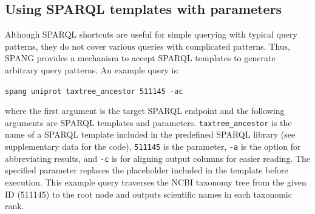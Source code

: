 \documentclass[runningheads]{llncs}
\begin{document}






\subsection{Using SPARQL templates with parameters}

Although SPARQL shortcuts are useful for simple querying with typical query patterns, they do not cover various
queries with complicated patterns. 
Thus, SPANG provides a mechanism to accept SPARQL templates to generate arbitrary query patterns. 
An example query is: 

\texttt{spang uniprot taxtree\_ancestor 511145 -ac}

\noindent where the first argument is the target SPARQL endpoint and the following arguments are SPARQL templates and parameters. {\tt taxtree\_ancestor} is the name of a SPARQL template included in the predefined SPARQL library (see supplementary data for the code), {\tt 511145} is the parameter, {\tt -a} is the option for abbreviating results, and {\tt -c} is for aligning output columns for easier reading.
The specified parameter replaces the placeholder included in the template before execution. 
This example query traverses the NCBI taxonomy tree from the given ID (511145) to the root node and outputs scientific names in each taxonomic rank.
\end{document}

